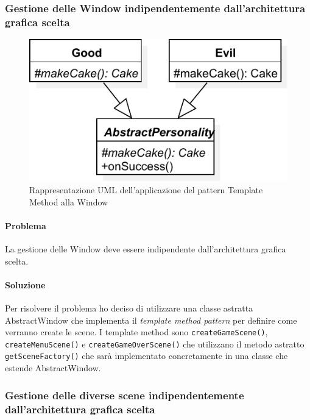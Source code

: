 \documentclass[a4paper,12pt]{report}
\begin{document}
\subsubsection{Gestione delle Window indipendentemente dall'architettura grafica scelta}

\begin{figure}[H]
\centering{}
\includegraphics[width=\textwidth]{img/template}
\caption{Rappresentazione UML dell'applicazione del pattern Template Method alla Window}
\label{img:template}
\end{figure}

\paragraph{Problema} La gestione delle Window deve essere indipendente dall'architettura grafica scelta.

\paragraph{Soluzione} Per risolvere il problema ho deciso di utilizzare una classe astratta AbstractWindow che implementa il \textit{template method pattern} per definire come verranno create le scene. I template method sono \texttt{createGameScene()}, \texttt{createMenuScene()} e \texttt{createGameOverScene()} che utilizzano il metodo astratto \texttt{getSceneFactory()} che sarà implementato concretamente in una classe che estende AbstractWindow.

\subsubsection{Gestione delle diverse scene indipendentemente dall'architettura grafica scelta}
\end{document}
